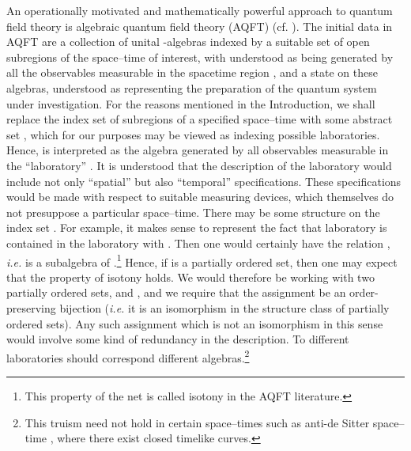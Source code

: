 \documentclass[a4paper,twoside,12pt]{article}
\def\inet{{\{\As_i \}_{i \in I}}}
\def\As{{\cal A}}
\def\Os{{\cal O}}
\begin{document}
     An operationally motivated and mathematically powerful approach
to quantum field theory is algebraic quantum field theory (AQFT) (cf.
\cite{Haag}). The initial data in AQFT are a collection \myHighlight{$\{\As(\Os)\}$}\coordHE{}
of unital \coordHE{}-algebras indexed by a suitable set of open subregions
\myHighlight{$\Os$}\coordHE{} of the space--time of interest, with \myHighlight{$\As(\Os)$}\coordHE{} understood as
being generated by all the observables measurable in the spacetime
region \myHighlight{$\Os$}\coordHE{}, and a state \myHighlight{$\omega$}\coordHE{} on these algebras, understood as
representing the preparation of the quantum system under
investigation. For the reasons mentioned in the Introduction, we shall
replace the index set of subregions of a specified space--time with
some abstract set \coordHE{}, which for our purposes may be viewed as
indexing possible laboratories.  Hence, \myHighlight{$\As_i$}\coordHE{} is interpreted as the
algebra generated by all observables measurable in the ``laboratory'' 
\coordHE{}. It is understood that the description of the laboratory would
include not only ``spatial'' but also ``temporal'' specifications. 
These specifications would be made with respect to suitable measuring
devices, which themselves do not presuppose a particular space--time.
There may be some structure on the index set \coordHE{}. For example,
it makes sense to represent the fact that laboratory \coordHE{} is contained
in the laboratory \coordHE{} with \coordHE{}. Then one would certainly have
the relation \myHighlight{$\As_i \subset \As_j$}\coordHE{}, {\it i.e.} \myHighlight{$\As_i$}\coordHE{} is a subalgebra
of \myHighlight{$\As_j$}\coordHE{}.\footnote{This property of the net \myHighlight{$\inet$}\coordHE{} is called isotony 
in the AQFT literature.} 
Hence, if \coordHE{} is a partially ordered set, then one may expect
that the property of isotony holds. We would therefore be working with two 
partially ordered sets, \coordHE{} and \myHighlight{$(\{ \As_i \}_{i \in I}, \subseteq)$}\coordHE{}, 
and we require that the assignment \myHighlight{$i \mapsto \As_i$}\coordHE{} be an order-preserving 
bijection ({\it i.e.} it is an isomorphism in the structure class of partially 
ordered sets). Any such assignment which is not an isomorphism in 
this sense would involve some kind of redundancy in the description. To 
different laboratories should correspond different algebras.\footnote{This
truism need not hold in certain space--times such as anti-de Sitter 
space--time \cite{BFS3,BFS4}, where there exist closed timelike curves.}
\end{document}
